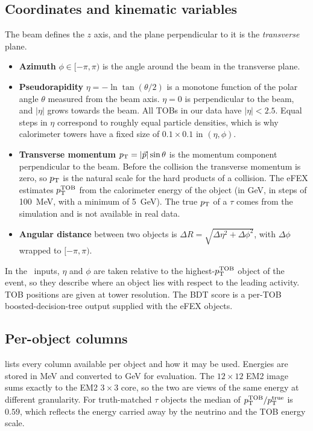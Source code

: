 \subsection{Coordinates and kinematic variables}
\label{app:coordinates}
The beam defines the $z$ axis, and the plane perpendicular to it is the \emph{transverse} plane.
\begin{itemize}
  \item \textbf{Azimuth} $\phi\in[-\pi,\pi)$ is the angle around the beam in the transverse plane.
  \item \textbf{Pseudorapidity} $\eta=-\ln\tan(\theta/2)$ is a monotone function of the polar angle $\theta$ measured from the beam axis. $\eta=0$ is perpendicular to the beam, and $|\eta|$ grows towards the beam. All TOBs in our data have $|\eta|<2.5$. Equal steps in $\eta$ correspond to roughly equal particle densities, which is why calorimeter towers have a fixed size of $0.1\times0.1$ in $(\eta,\phi)$.
  \item \textbf{Transverse momentum} $p_{\mathrm{T}}=|\vec p|\sin\theta$ is the momentum component perpendicular to the beam. Before the collision the transverse momentum is zero, so $p_{\mathrm{T}}$ is the natural scale for the hard products of a collision. The eFEX estimates $p_{\mathrm{T}}^{\mathrm{TOB}}$ from the calorimeter energy of the object (in GeV, in steps of \SI{100}{MeV}, with a minimum of \SI{5}{GeV}). The true $p_{\mathrm{T}}$ of a $\tau$ comes from the simulation and is not available in real data.
  \item \textbf{Angular distance} between two objects is $\Delta R=\sqrt{\Delta\eta^2+\Delta\phi^2}$, with $\Delta\phi$ wrapped to $[-\pi,\pi)$.
\end{itemize}
In the \CP\ inputs, $\eta$ and $\phi$ are taken relative to the highest-$p_{\mathrm{T}}^{\mathrm{TOB}}$ object of the event, so they describe where an object lies with respect to the leading activity. TOB positions are given at tower resolution. The BDT score is a per-TOB boosted-decision-tree output supplied with the eFEX objects.

\subsection{Per-object columns}
 lists every column available per object and how it may be used. Energies are stored in MeV and converted to GeV for evaluation. The $12\times12$ EM2 image sums exactly to the EM2 $3\times3$ core, so the two are views of the same energy at different granularity. For truth-matched $\tau$ objects the median of $p_{\mathrm{T}}^{\mathrm{TOB}}/p_{\mathrm{T}}^{\mathrm{true}}$ is $0.59$, which reflects the energy carried away by the neutrino and the TOB energy scale.

